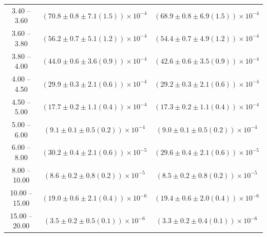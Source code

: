 \begin{table}
\begin{center}
\begin{tabular}{ c | c c }
3.40 -- 3.60 & $(70.8\pm0.8\pm7.1(1.5))\times10^{-4}$ & $(68.9\pm0.8\pm6.9(1.5))\times10^{-4}$ \\ 
3.60 -- 3.80 & $(56.2\pm0.7\pm5.1(1.2))\times10^{-4}$ & $(54.4\pm0.7\pm4.9(1.2))\times10^{-4}$ \\ 
3.80 -- 4.00 & $(44.0\pm0.6\pm3.6(0.9))\times10^{-4}$ & $(42.6\pm0.6\pm3.5(0.9))\times10^{-4}$ \\ 
4.00 -- 4.50 & $(29.9\pm0.3\pm2.1(0.6))\times10^{-4}$ & $(29.2\pm0.3\pm2.1(0.6))\times10^{-4}$ \\ 
4.50 -- 5.00 & $(17.7\pm0.2\pm1.1(0.4))\times10^{-4}$ & $(17.3\pm0.2\pm1.1(0.4))\times10^{-4}$ \\ 
5.00 -- 6.00 & $(9.1\pm0.1\pm0.5(0.2))\times10^{-4}$ & $(9.0\pm0.1\pm0.5(0.2))\times10^{-4}$ \\ 
6.00 -- 8.00 & $(30.2\pm0.4\pm2.1(0.6))\times10^{-5}$ & $(29.6\pm0.4\pm2.1(0.6))\times10^{-5}$ \\ 
8.00 -- 10.00 & $(8.6\pm0.2\pm0.8(0.2))\times10^{-5}$ & $(8.5\pm0.2\pm0.8(0.2))\times10^{-5}$ \\ 
10.00 -- 15.00 & $(19.0\pm0.6\pm2.1(0.4))\times10^{-6}$ & $(19.4\pm0.6\pm2.0(0.4))\times10^{-6}$ \\ 
15.00 -- 20.00 & $(3.5\pm0.2\pm0.5(0.1))\times10^{-6}$ & $(3.3\pm0.2\pm0.4(0.1))\times10^{-6}$ \\ 
\hline
\end{tabular}
\end{center}
\end{table}
 
